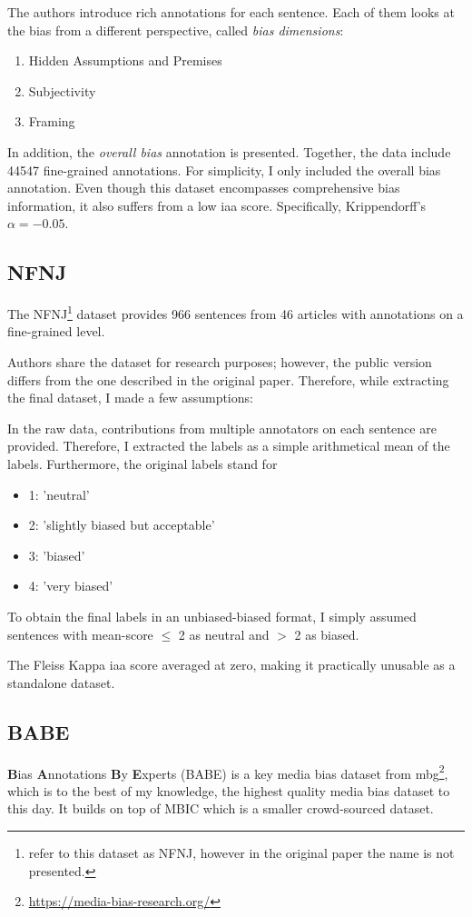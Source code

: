 The authors introduce rich annotations for each sentence. Each of them looks at the bias from a different perspective, called \textit{bias dimensions}:
\begin{enumerate}
    \item Hidden Assumptions and Premises
    \item Subjectivity
    \item Framing
\end{enumerate}
In addition, the \textit{overall bias} annotation is presented. Together, the data include 44547 fine-grained annotations. For simplicity, I only included the overall bias annotation.
Even though this dataset encompasses comprehensive bias information, it also suffers from a low \Gls{iaa} score. Specifically, Krippendorff’s $\alpha = -0.05$.



\subsection{NFNJ}
The NFNJ\footnote{\cite{farber2020multidimensional} refer to this dataset as NFNJ, however in the original paper the name is not presented.} dataset provides 966 sentences from 46 articles with annotations on a fine-grained level.

Authors share the dataset for research purposes; however, the public version differs from the one described in the original paper. Therefore, while extracting the final dataset, I made a few assumptions:

In the raw data, contributions from multiple annotators on each sentence are provided. Therefore, I extracted the labels as a simple arithmetical mean of the labels. Furthermore, the original labels stand for 
\begin{itemize}
    \item 1: 'neutral'
    \item 2: 'slightly biased but acceptable'
    \item 3: 'biased'
    \item 4: 'very biased'
\end{itemize}
To obtain the final labels in an unbiased-biased format, I simply assumed sentences with mean-score $\leq$ 2 as neutral and $>$ 2 as biased.

The Fleiss Kappa \Gls{iaa} score averaged at zero, making it practically unusable as a standalone dataset.



\subsection{BABE}
\textbf{B}ias \textbf{A}nnotations \textbf{B}y \textbf{E}xperts (BABE) is a key media bias dataset from \Gls{mbg}\footnote{\url{https://media-bias-research.org/}}, which is to the best of my knowledge, the highest quality media bias dataset to this day. It builds on top of MBIC \cite{Spinde2021MBIC} which is a smaller crowd-sourced dataset.

